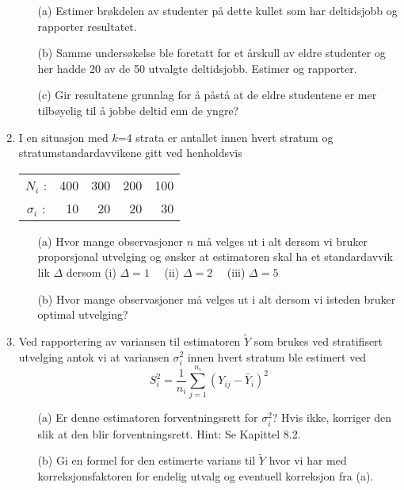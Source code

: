 \begin{enumerate}
\begin{itemize}
\item[(a)]  Estimer brøkdelen av studenter på dette kullet som har
deltidsjobb og rapporter resultatet.
\item[(b)]  Samme undersøkelse ble foretatt for et årskull av eldre 
studenter og her hadde 20 av de 50 utvalgte deltidsjobb.
Estimer og rapporter.
\item[(c)]  Gir resultatene grunnlag for å påstå at de eldre 
studentene er mer tilbøyelig til å jobbe deltid enn de yngre?
\end{itemize}

\item  I en situasjon med $k$=4 strata er antallet innen hvert stratum og
stratumstandardavvikene gitt ved henholdsvis
\begin{center}
\begin{tabular}{crrrr}
 $N_i$ :   &     400   &   300   &   200   &   100 \\
 ${\sigma}_i$ : & 10   &    20   &    20   &    30
\end{tabular}
\end{center}
\begin{itemize}
\item[(a)] Hvor mange observasjoner $n$ må velges ut i alt dersom vi bruker
proporsjonal utvelging og ønsker at estimatoren skal ha et standardavvik
lik $\Delta$ dersom
 (i) $\Delta =1$ \ \  (ii) $\Delta= 2$ \ \  (iii) $\Delta =5$

\item[(b)]  Hvor mange observasjoner må velges ut i alt dersom vi 
isteden bruker optimal utvelging?
\end{itemize}

\item  Ved rapportering av variansen til estimatoren $\tilde{Y}$ som brukes
ved stratifisert utvelging antok vi at variansen ${\sigma}_i^2$ innen hvert 
stratum ble estimert ved 
\[ S_i^2=\frac{1}{n_i}\sum_{j=1}^{n_i}{(Y_{ij}-{\bar{Y}}_i)}^2      \]
\begin{itemize}
\item[(a)]  Er denne estimatoren forventningsrett for ${\sigma}_i^2$?  Hvis
ikke, korriger den slik at den blir forventningsrett.  Hint:  Se Kapittel
8.2.
\item[(b)]  Gi en formel for den estimerte varians til $\tilde{Y}$ hvor vi
har med korreksjonsfaktoren for endelig utvalg og eventuell korreksjon fra
(a).
\end{itemize}


\end{enumerate}
